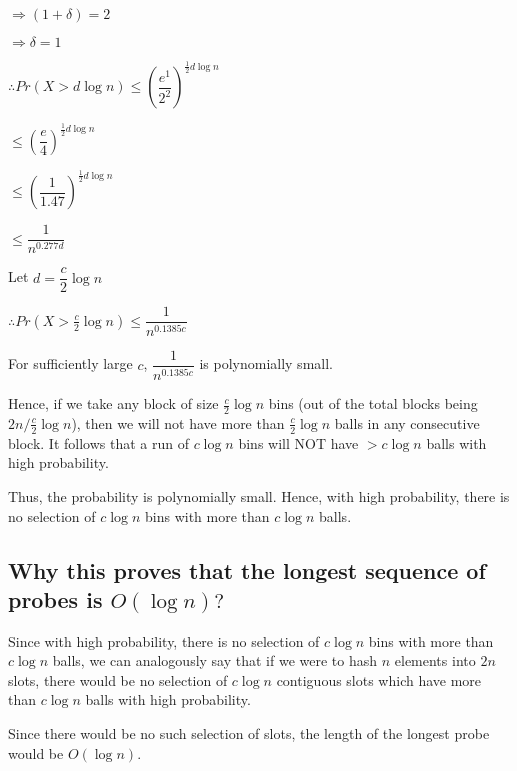\documentclass{article}
\begin{document}
$\Rightarrow (1+\delta) = 2$

$\Rightarrow \delta = 1$

$\therefore Pr(X > d\log{n}) \le \left( \dfrac{e^1}{2^2} \right)^{\frac{1}{2}d\log{n}}$

$\le \left( \dfrac{e}{4} \right)^{\frac{1}{2}d\log{n}}$

$\le \left( \dfrac{1}{1.47} \right)^{\frac{1}{2}d\log{n}}$

$\le \dfrac{1}{n^{0.277d}}$

Let $d = \dfrac{c}{2}\log{n}$

$\therefore Pr(X > \frac{c}{2}\log{n}) \le \dfrac{1}{n^{0.1385c}}$

For sufficiently large $c$, $\dfrac{1}{n^{0.1385c}}$ is polynomially
small.

Hence, if we take any block of size $\frac{c}{2}\log{n}$ bins (out of
the total blocks being ${2n}/{\frac{c}{2}\log{n}}$), then we will
not have more than $\frac{c}{2}\log{n}$ balls in any consecutive
block. It follows that a run of $c\log{n}$ bins will NOT have $>
c\log{n}$ balls with high probability.

Thus, the probability is polynomially small. Hence, with high
probability, there is no selection of $c\log{n}$ bins with more than
$c\log{n}$ balls.

\subsection{Why this proves that the longest sequence of probes
is $O(\log{n})?$}

Since with high probability, there is no selection of $c\log{n}$ bins
with more than $c\log{n}$ balls, we can analogously say that if we
were to hash $n$ elements into $2n$ slots, there would be no selection
of $c\log{n}$ contiguous slots which have more than $c\log{n}$ balls
with high probability.

Since there would be no such selection of slots, the length of the
longest probe would be $O(\log{n})$.

\clearpage
\end{document}
